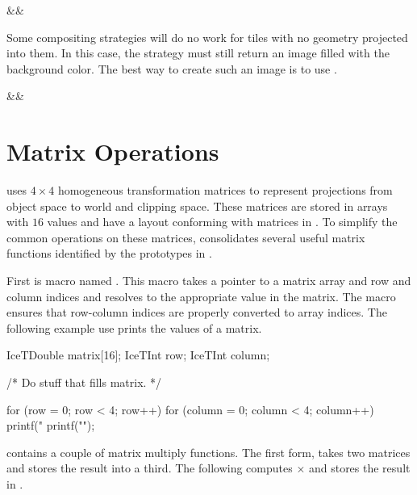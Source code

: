 \begin{Table}{3}
  \textC{(}&&\quad\textC{);}
\end{Table}

\label{manpage:icetClearImageTrueBackground}
Some compositing strategies will do no work for tiles with no geometry
projected into them.  In this case, the strategy must still return an image
filled with the background color.  The best way to create such an image is
to use .

\begin{Table}{3}
  \textC{(}&&\quad\textC{);}
\end{Table}


\section{Matrix Operations}
\label{sec:New_Strategies:Matrix_Operations}


\IceT uses $4 \times 4$ homogeneous transformation matrices to represent
projections from object space to world and clipping space.  These matrices
are stored in  arrays with $16$ values and have a layout
conforming with matrices in \OpenGL.  To simplify the common operations on
these matrices, \IceT consolidates several useful matrix functions
identified by the prototypes in .

First is macro named .  This macro
takes a pointer to a matrix array and row and column indices and resolves
to the appropriate value in the matrix.  The  macro
ensures that row-column indices are properly converted to array indices.
The following example use prints the values of a matrix.

\begin{code}
IceTDouble matrix[16];
IceTInt row;
IceTInt column;

/* Do stuff that fills matrix. */

for (row = 0; row < 4; row++) {
  for (column = 0; column < 4; column++) {
    printf("%
  }
  printf("\n");
}
\end{code}

\label{manpage:icetMatrixMultiply}
 contains a couple of matrix multiply functions.
The first form, takes two matrices and stores the result into a third.
The following computes  $\times$  and stores the result in
.

